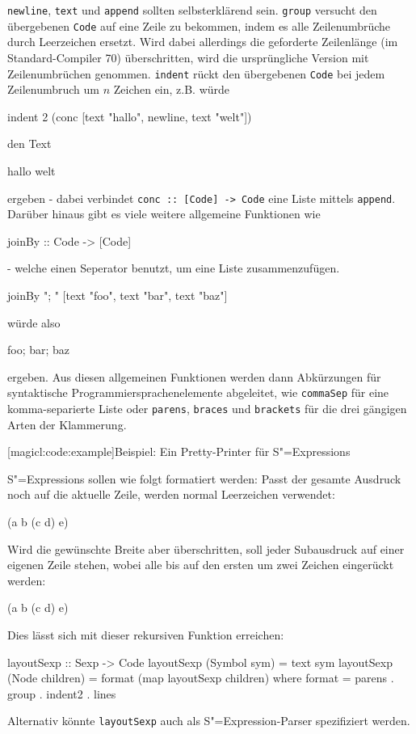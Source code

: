 \documentclass[a4paper, bibgerm]{book}
\newcommand\icode[1]{\lstinline?#1?}
\newcommand\lsection{}
\newcommand{\sexp}{S"=Expression}
\newcommand{\sexps}{S"=Expressions}
\begin{document}
\icode{newline}, \icode{text} und \icode{append} sollten selbsterklärend
sein. \icode{group} versucht den übergebenen \icode{Code} auf eine Zeile
zu bekommen, indem es alle Zeilenumbrüche durch Leerzeichen
ersetzt. Wird dabei allerdings die geforderte Zeilenlänge (im
Standard-Compiler 70) überschritten, wird die ursprüngliche Version mit
Zeilenumbrüchen genommen. \icode{indent} rückt den übergebenen
\icode{Code} bei jedem Zeilenumbruch um $n$ Zeichen ein, z.B. würde
\begin{code} 
indent 2 (conc [text "hallo", newline, text "welt"])
\end{code}
den Text
\begin{code}
hallo
  welt  
\end{code}
ergeben - dabei verbindet \icode{conc :: [Code] -> Code} eine Liste
mittels \icode{append}. Darüber hinaus gibt es viele weitere allgemeine
Funktionen wie 
\begin{code}
  joinBy :: Code -> [Code]
\end{code}
- welche einen Seperator benutzt, um eine Liste zusammenzufügen.
\begin{code}
joinBy "; " [text "foo", text "bar", text "baz"]  
\end{code}
würde also
\begin{code}
foo; bar; baz
\end{code}
ergeben. Aus diesen allgemeinen Funktionen werden dann Abkürzungen für
syntaktische Programmiersprachenelemente abgeleitet, wie
\icode{commaSep} für eine komma-separierte Liste oder \icode{parens},
\icode{braces} und \icode{brackets} für die drei gängigen Arten der
Klammerung.

\lsection[magicl:code:example]{Beispiel: Ein Pretty-Printer für \sexps{}}

\sexps{} sollen wie folgt formatiert werden: Passt der gesamte Ausdruck
noch auf die aktuelle Zeile, werden normal Leerzeichen verwendet:
\begin{code}
(a b (c d) e)  
\end{code}
Wird die gewünschte Breite aber überschritten, soll jeder Subausdruck
auf einer eigenen Zeile stehen, wobei alle bis auf den ersten um zwei
Zeichen eingerückt werden:
\begin{code}
(a
  b 
  (c d)
  e)  
\end{code}
Dies lässt sich mit dieser rekursiven Funktion erreichen:
\begin{code}
layoutSexp :: Sexp -> Code
layoutSexp (Symbol sym)    = text sym
layoutSexp (Node children) = format (map layoutSexp children)
  where format = parens . group . indent2 . lines
\end{code} %
Alternativ könnte \icode{layoutSexp} auch als \sexp{}-Parser
spezifiziert werden.
\end{document}
